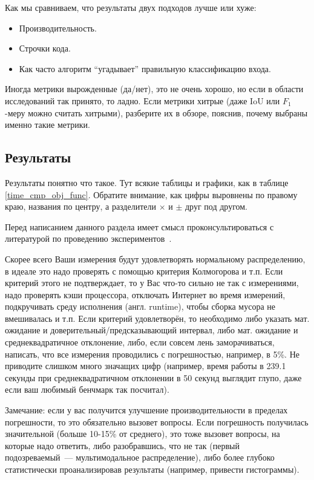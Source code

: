 Как мы сравниваем, что результаты двух подходов лучше или хуже:
\begin{itemize}
    \item Производительность.
    \item Строчки кода.
    \item Как часто алгоритм \enquote{угадывает} правильную класси\-фикацию входа.
\end{itemize}

\noindent Иногда метрики вырожденные (да/нет), это не очень хорошо, но если в области исследований так принято, то ладно.
Если метрики хитрые (даже IoU или $F_1$-меру можно считать хитрыми), разберите их в обзоре, пояснив, почему выбраны именно такие метрики.

\subsection{Результаты}
Результаты понятно что такое.
Тут всякие таблицы и графики, как в таблице \ref{time_cmp_obj_func}.
Обратите внимание, как цифры выровнены по правому краю, названия по центру, а разделители $\times$ и $\pm$ друг под другом.

Перед написанием данного раздела имеет смысл проконсультироваться с литературой по проведению экспериментов~\cite{SmirnovCheatsheet}.

Скорее всего Ваши измерения будут удовлетворять нормальному распределению, в идеале это надо проверять с помощью критерия Кол\-могорова и т.п.
Если критерий этого не подтверждает, то у Вас что-то сильно не так с измерениями, надо проверять кэши процессора, отключать Интернет во время измерений, подкручивать среду исполне\-ния (англ. runtime), что\-бы сборка мусора не вмешивалась и т.п.
Если критерий удовлетворён, то необходимо либо указать мат. ожидание и доверительный/предсказы\-вающий интервал, либо мат. ожидание и среднеквадратичное отклонение, либо, если совсем лень заморачиваться, написать, что все измерения проводились с погрешностью, например, в 5\%.
Не приводите слишком много значащих цифр (например, время работы в 239.1 секунды при среднеквадратичном отклонении в 50 секунд выглядит глупо, даже если ваш любимый бенчмарк так посчитал).

Замечание: если у вас получится улуч\-шение производительности в пределах погреш\-ности, то это обязательно вызовет вопросы.
Если погрешность получилась значительной (больше 10-15\% от среднего), это тоже вызовет вопросы, на которые надо ответить, либо разобравшись, что не так (первый подозреваемый~--- мультимодальное распределение), либо более глубоко статистически проанализировав результаты (например, привести гистограммы).

